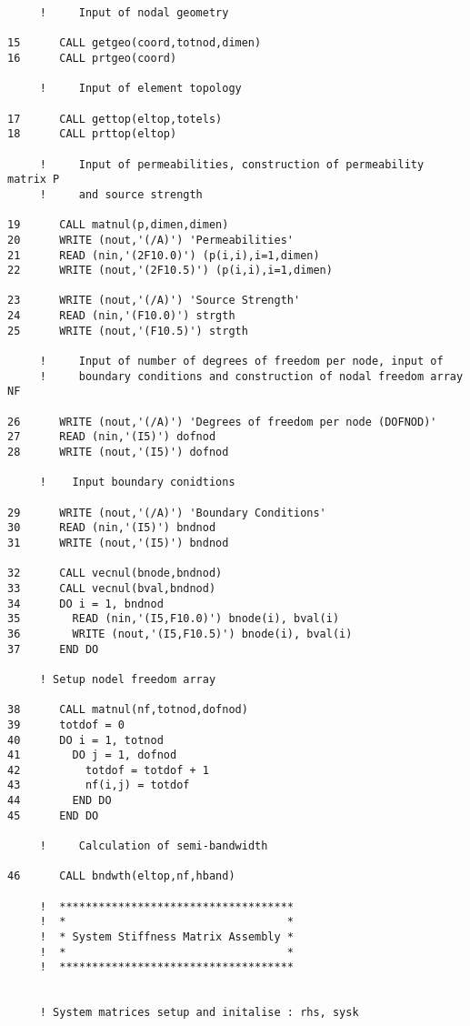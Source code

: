 \begin{verbatim}
     !     Input of nodal geometry
     
15      CALL getgeo(coord,totnod,dimen)
16      CALL prtgeo(coord)
     
     !     Input of element topology
     
17      CALL gettop(eltop,totels)
18      CALL prttop(eltop)
     
     !     Input of permeabilities, construction of permeability matrix P
     !     and source strength
     
19      CALL matnul(p,dimen,dimen)
20      WRITE (nout,'(/A)') 'Permeabilities'
21      READ (nin,'(2F10.0)') (p(i,i),i=1,dimen)
22      WRITE (nout,'(2F10.5)') (p(i,i),i=1,dimen)
     
23      WRITE (nout,'(/A)') 'Source Strength'
24      READ (nin,'(F10.0)') strgth
25      WRITE (nout,'(F10.5)') strgth
     
     !     Input of number of degrees of freedom per node, input of
     !     boundary conditions and construction of nodal freedom array NF
     
26      WRITE (nout,'(/A)') 'Degrees of freedom per node (DOFNOD)'
27      READ (nin,'(I5)') dofnod
28      WRITE (nout,'(I5)') dofnod
     
     !    Input boundary conidtions
     
29      WRITE (nout,'(/A)') 'Boundary Conditions'
30      READ (nin,'(I5)') bndnod
31      WRITE (nout,'(I5)') bndnod
     
32      CALL vecnul(bnode,bndnod)
33      CALL vecnul(bval,bndnod)
34      DO i = 1, bndnod
35        READ (nin,'(I5,F10.0)') bnode(i), bval(i)
36        WRITE (nout,'(I5,F10.5)') bnode(i), bval(i)
37      END DO
     
     ! Setup nodel freedom array
     
38      CALL matnul(nf,totnod,dofnod)
39      totdof = 0
40      DO i = 1, totnod
41        DO j = 1, dofnod
42          totdof = totdof + 1
43          nf(i,j) = totdof
44        END DO
45      END DO
     
     !     Calculation of semi-bandwidth
     
46      CALL bndwth(eltop,nf,hband)
     
     !  ************************************
     !  *                                  *
     !  * System Stiffness Matrix Assembly *
     !  *                                  *
     !  ************************************
     
     
     ! System matrices setup and initalise : rhs, sysk
     

\end{verbatim}

